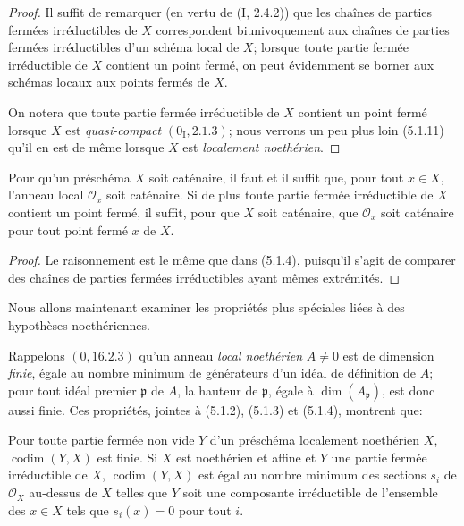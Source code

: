 \begin{proof}
Il suffit de remarquer (en vertu de (I, 2.4.2)) que les chaînes de parties
fermées irréductibles de $X$ correspondent biunivoquement aux chaînes de
parties fermées irréductibles d'un schéma local de $X$; lorsque toute partie
fermée irréductible de $X$ contient un point fermé, on peut évidemment se
borner aux schémas locaux aux points fermés de $X$.

On notera que toute partie fermée irréductible de $X$ contient un point fermé
lorsque $X$ est \emph{quasi-compact} $(0_{\mathrm I},2.1.3)$; nous verrons un
peu plus loin (5.1.11) qu'il en est de même lorsque $X$ est \emph{localement
noethérien}.
\end{proof}

\begin{corollary}[5.1.5]
\label{IV.2.5.1.5-fr}
Pour qu'un préschéma $X$ soit caténaire, il faut et il suffit que, pour tout
$x\in X$, l'anneau local $\mathcal O_x$ soit caténaire. Si de plus toute
partie fermée irréductible de $X$ contient un point fermé, il suffit, pour que
$X$ soit caténaire, que $\mathcal O_x$ soit caténaire pour tout point fermé
$x$ de $X$.
\end{corollary}

\begin{proof}
Le raisonnement est le même que dans (5.1.4), puisqu'il s'agit de comparer des
chaînes de parties fermées irréductibles ayant mêmes extrémités.
\end{proof}

\begin{env}[5.1.6]
\label{IV.2.5.1.6-fr}
Nous allons maintenant examiner les propriétés plus spéciales liées à des
hypothèses noethériennes.

Rappelons $(0,16.2.3)$ qu'un anneau \emph{local noethérien} $A\ne0$ est de
dimension \emph{finie}, égale au nombre minimum de générateurs d'un idéal de
définition de $A$; pour tout idéal premier $\mathfrak p$ de $A$, la hauteur de
$\mathfrak p$, égale à $\dim(A_{\mathfrak p})$, est donc aussi finie. Ces
propriétés, jointes à (5.1.2), (5.1.3) et (5.1.4), montrent que:
\end{env}

\begin{proposition}[5.1.7]
\label{IV.2.5.1.7-fr}
Pour toute partie fermée non vide $Y$ d'un préschéma localement noethérien
$X$, $\operatorname{codim}(Y,X)$ est finie. Si $X$ est noethérien et affine
et $Y$ une partie fermée irréductible de $X$, $\operatorname{codim}(Y,X)$ est
égal au nombre minimum des sections $s_i$ de $\mathcal O_X$ au-dessus de $X$
telles que $Y$ soit une composante irréductible de l'ensemble des $x\in X$
tels que $s_i(x)=0$ pour tout $i$.
\end{proposition}

